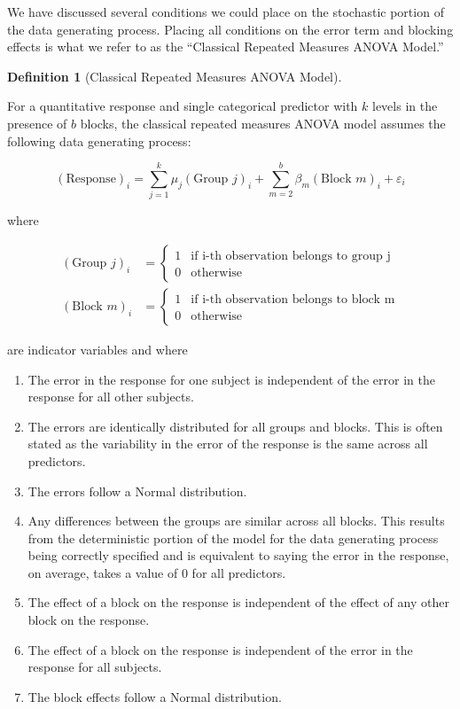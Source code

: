 \documentclass[
  letterpaper,
  DIV=11,
  numbers=noendperiod]{scrreprt}
\providecommand{\tightlist}{%
  \setlength{\itemsep}{0pt}\setlength{\parskip}{0pt}}\usepackage{longtable,booktabs,array}
\theoremstyle{definition}
\newtheorem{definition}{Definition}[chapter]
\theoremstyle{definition}
\theoremstyle{plain}
\theoremstyle{remark}
\begin{document}
We have discussed several conditions we could place on the stochastic
portion of the data generating process. Placing all conditions on the
error term and blocking effects is what we refer to as the ``Classical
Repeated Measures ANOVA Model.''

\begin{definition}[Classical Repeated Measures ANOVA
Model]\protect\hypertarget{def-classical-repeated-measures-anova}{}\label{def-classical-repeated-measures-anova}

For a quantitative response and single categorical predictor with \(k\)
levels in the presence of \(b\) blocks, the classical repeated measures
ANOVA model assumes the following data generating process:

\[(\text{Response})_i = \sum_{j=1}^{k} \mu_j (\text{Group } j)_i + \sum_{m=2}^{b} \beta_m (\text{Block } m)_i + \varepsilon_i\]

where

\[
\begin{aligned}
  (\text{Group } j)_{i} &= \begin{cases}
    1 & \text{if i-th observation belongs to group j} \\
    0 & \text{otherwise}
    \end{cases} \\
  (\text{Block } m)_{i} &= \begin{cases}
    1 & \text{if i-th observation belongs to block m} \\
    0 & \text{otherwise}
    \end{cases}
\end{aligned}
\]

are indicator variables and where

\begin{enumerate}
\def\labelenumi{\arabic{enumi}.}
\tightlist
\item
  The error in the response for one subject is independent of the error
  in the response for all other subjects.
\item
  The errors are identically distributed for all groups and blocks. This
  is often stated as the variability in the error of the response is the
  same across all predictors.
\item
  The errors follow a Normal distribution.
\item
  Any differences between the groups are similar across all blocks. This
  results from the deterministic portion of the model for the data
  generating process being correctly specified and is equivalent to
  saying the error in the response, on average, takes a value of 0 for
  all predictors.
\item
  The effect of a block on the response is independent of the effect of
  any other block on the response.
\item
  The effect of a block on the response is independent of the error in
  the response for all subjects.
\item
  The block effects follow a Normal distribution.
\end{enumerate}


\end{definition}
\end{document}
